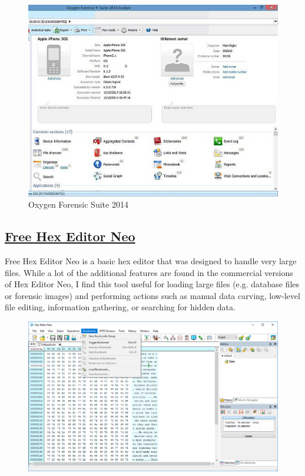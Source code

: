 \documentclass[11pt]{article}
\begin{document}
\begin{figure}[H]
    \centering
    \includegraphics[width=.85\textwidth]{./014.jpg}
    \caption{Oxygen Forensic Suite 2014}
\end{figure}



\subsection{\href{https://www.hhdsoftware.com/free-hex-editor}{Free Hex Editor Neo}}

Free Hex Editor Neo is a basic hex editor that was designed to handle very large files. While a lot of the additional features are found in the commercial versions of Hex Editor Neo, I find this tool useful for loading large files (e.g. database files or forensic images) and performing actions such as manual data carving, low-level file editing, information gathering, or searching for hidden data.

\begin{figure}[H]
    \centering
    \includegraphics[width=.85\textwidth]{./HHD-Software-Hex-Editor_29.png}
    \caption{}
\end{figure}
\end{document}
